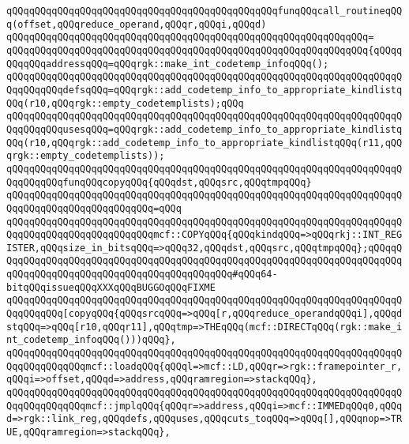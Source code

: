 \verb|qQQqqQQqqQQqqQQqqQQqqQQqqQQqqQQqqQQqqQQqqQQqqQQqfunqQQqcall_routineqQQq(offset,qQQqreduce_operand,qQQqr,qQQqi,qQQqd)|\newline
\verb|qQQqqQQqqQQqqQQqqQQqqQQqqQQqqQQqqQQqqQQqqQQqqQQqqQQqqQQqqQQqqQQq=|\newline
\verb|qQQqqQQqqQQqqQQqqQQqqQQqqQQqqQQqqQQqqQQqqQQqqQQqqQQqqQQqqQQqqQQq{qQQqqQQqqQQqaddressqQQq=qQQqrgk::make_int_codetemp_infoqQQq();|\newline
\verb|qQQqqQQqqQQqqQQqqQQqqQQqqQQqqQQqqQQqqQQqqQQqqQQqqQQqqQQqqQQqqQQqqQQqqQQqqQQqqQQqdefsqQQq=qQQqrgk::add_codetemp_info_to_appropriate_kindlistqQQq(r10,qQQqrgk::empty_codetemplists);qQQq|\newline
\verb|qQQqqQQqqQQqqQQqqQQqqQQqqQQqqQQqqQQqqQQqqQQqqQQqqQQqqQQqqQQqqQQqqQQqqQQqqQQqqQQqusesqQQq=qQQqrgk::add_codetemp_info_to_appropriate_kindlistqQQq(r10,qQQqrgk::add_codetemp_info_to_appropriate_kindlistqQQq(r11,qQQqrgk::empty_codetemplists));|\newline
\newline
\verb|qQQqqQQqqQQqqQQqqQQqqQQqqQQqqQQqqQQqqQQqqQQqqQQqqQQqqQQqqQQqqQQqqQQqqQQqqQQqqQQqfunqQQqcopyqQQq{qQQqdst,qQQqsrc,qQQqtmpqQQq}|\newline
\verb|qQQqqQQqqQQqqQQqqQQqqQQqqQQqqQQqqQQqqQQqqQQqqQQqqQQqqQQqqQQqqQQqqQQqqQQqqQQqqQQqqQQqqQQqqQQqqQQq=qQQq|\newline
\verb|qQQqqQQqqQQqqQQqqQQqqQQqqQQqqQQqqQQqqQQqqQQqqQQqqQQqqQQqqQQqqQQqqQQqqQQqqQQqqQQqqQQqqQQqqQQqqQQqmcf::COPYqQQq{qQQqkindqQQq=>qQQqrkj::INT_REGISTER,qQQqsize_in_bitsqQQq=>qQQq32,qQQqdst,qQQqsrc,qQQqtmpqQQq};qQQqqQQqqQQqqQQqqQQqqQQqqQQqqQQqqQQqqQQqqQQqqQQqqQQqqQQqqQQqqQQqqQQqqQQqqQQqqQQqqQQqqQQqqQQqqQQqqQQqqQQqqQQqqQQqqQQq#qQQq64-bitqQQqissueqQQqXXXqQQqBUGGOqQQqFIXME|\newline
\newline
\verb|qQQqqQQqqQQqqQQqqQQqqQQqqQQqqQQqqQQqqQQqqQQqqQQqqQQqqQQqqQQqqQQqqQQqqQQqqQQqqQQq[copyqQQq{qQQqsrcqQQq=>qQQq[r,qQQqreduce_operandqQQqi],qQQqdstqQQq=>qQQq[r10,qQQqr11],qQQqtmp=>THEqQQq(mcf::DIRECTqQQq(rgk::make_int_codetemp_infoqQQq()))qQQq},|\newline
\verb|qQQqqQQqqQQqqQQqqQQqqQQqqQQqqQQqqQQqqQQqqQQqqQQqqQQqqQQqqQQqqQQqqQQqqQQqqQQqqQQqqQQqmcf::loadqQQq{qQQql=>mcf::LD,qQQqr=>rgk::framepointer_r,qQQqi=>offset,qQQqd=>address,qQQqramregion=>stackqQQq},|\newline
\verb|qQQqqQQqqQQqqQQqqQQqqQQqqQQqqQQqqQQqqQQqqQQqqQQqqQQqqQQqqQQqqQQqqQQqqQQqqQQqqQQqqQQqmcf::jmplqQQq{qQQqr=>address,qQQqi=>mcf::IMMEDqQQq0,qQQqd=>rgk::link_reg,qQQqdefs,qQQquses,qQQqcuts_toqQQq=>qQQq[],qQQqnop=>TRUE,qQQqramregion=>stackqQQq},|\newline
